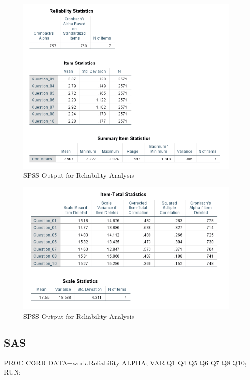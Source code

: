 \documentclass[
]{book}
\newenvironment{Shaded}{\begin{snugshade}}{\end{snugshade}}
\newcommand{\NormalTok}[1]{#1}
\begin{document}
\begin{figure}[!h]
\includegraphics{Screenshots/Reliability/ReliabilitySPSS1} \caption{\label{fig:reliSPSS}SPSS Output for Reliability Analysis}\label{fig:reliSPSS}
\end{figure}

\begin{figure}[!h]
\includegraphics{Screenshots/Reliability/ReliabilitySPSS2} \caption{\label{fig:reliSPSS2}SPSS Output for Reliability Analysis}\label{fig:reliSPSS2}
\end{figure}

\hypertarget{sas}{%
\subsection{SAS}\label{sas}}

\begin{Shaded}
\begin{Highlighting}[]
\NormalTok{PROC CORR DATA=work.Reliability ALPHA;}
\NormalTok{    VAR Q1 Q4 Q5 Q6 Q7 Q8 Q10;}
\NormalTok{RUN;}
\end{Highlighting}
\end{Shaded}
\end{document}
